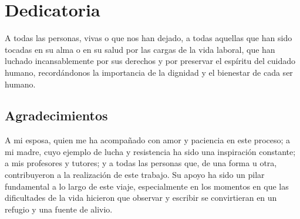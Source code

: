 \section*{Dedicatoria}

\vspace{2cm}

A todas las personas, vivas o que nos han dejado, a todas aquellas que han sido tocadas en su alma o en su salud por las cargas de la vida laboral, que han luchado incansablemente por sus derechos y por preservar el espíritu del cuidado humano, recordándonos la importancia de la dignidad y el bienestar de cada ser humano.

\vspace{4cm}

\subsection*{Agradecimientos}
A mi esposa, quien me ha acompañado con amor y paciencia en este proceso; a mi madre, cuyo ejemplo de lucha y resistencia ha sido una inspiración constante; a mis profesores y tutores; y a todas las personas que, de una forma u otra, contribuyeron a la realización de este trabajo. Su apoyo ha sido un pilar fundamental a lo largo de este viaje, especialmente en los momentos en que las dificultades de la vida hicieron que observar y escribir se convirtieran en un refugio y una fuente de alivio.
\pagebreak